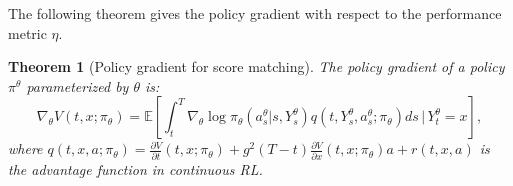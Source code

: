 \documentclass[letterpaper,11pt,reqno]{amsart}
\newtheorem{theorem}{Theorem}[section]
\numberwithin{equation}{section}
\begin{document}

\quad The following theorem gives the policy gradient with respect to the performance metric $\eta$. 
\begin{theorem}[Policy gradient for score matching]
\cite{GZZ24, ZCZ25}
\label{thm:PG formula simplified}
The policy gradient of a policy $\pi^{\theta}$ parameterized by $\theta$ is:
\begin{equation}
\nabla_{\theta} V(t,x; \pi_\theta)= \mathbb{E}\left[\int _ {t} ^ { T }\nabla_{\theta} \log \pi_{\theta} ( a _ {s}^{\theta} | s , Y _ {s}^{\theta} ) q(t, Y_s^{\theta}, a_s^{\theta} ; \pi_\theta)ds \, \bigg| \, Y^\theta_t = x\right],
\end{equation}
where 
$q(t, x, a ; \pi_\theta)=\frac{\partial V}{\partial t}\left(t, x ; \pi_\theta\right)+ g^2(T-t) \frac{\partial V}{\partial x}\left(t,x ; \pi_\theta \right) a + r(t,x,a)$ is the advantage function in continuous RL.
\end{theorem}
\end{document}
